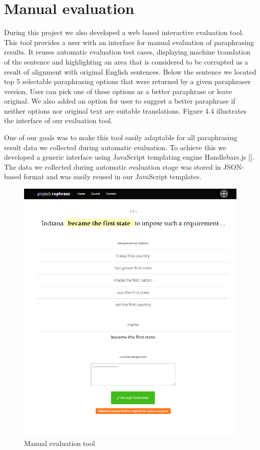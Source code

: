 \section{Manual evaluation}

During this project we also developed a web based interactive evaluation tool. This tool provides a user with an interface for manual evaluation of paraphrasing results. It reuses automatic evaluation test cases, displaying machine translation of the sentence and highlighting an area that is considered to be corrupted as a result of alignment with original English sentences. Below the sentence we located top 5 selectable paraphrasing options that were returned by a given paraphraser version. User can pick one of these options as a better paraphrase or leave original. We also added an option for user to suggest a better paraphrase if neither options nor original text are suitable translations. Figure 4.4 illustrates the interface of our evaluation tool. 

One of our goals was to make this tool easily adaptable for all paraphrasing result data we collected during automatic evaluation. To achieve this we developed a generic interface using JavaScript templating engine Handlebars.js []. The data we collected during automatic evaluation stage was stored in JSON-based format and was easily reused in our JavaScript templates.

\begin{figure}
 \centering 
 \includegraphics[scale=0.8]{g/man-eval.png}
 \caption{Manual evaluation tool}
\end{figure}

